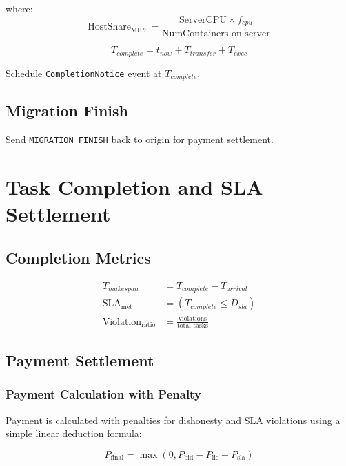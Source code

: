 \documentclass[12pt,a4paper]{article}
\begin{document}
where:
\begin{equation}
    \text{HostShare}_{\text{MIPS}} = \frac{\text{ServerCPU} \times f_{cpu}}{\text{NumContainers on server}}
\end{equation}

\begin{equation}
    T_{complete} = t_{now} + T_{transfer} + T_{exec}
\end{equation}

Schedule \texttt{CompletionNotice} event at $T_{complete}$.

\subsection{Migration Finish}

Send \texttt{MIGRATION\_FINISH} back to origin for payment settlement.

\section{Task Completion and SLA Settlement}

\subsection{Completion Metrics}

\begin{align}
    T_{makespan} &= T_{complete} - T_{arrival} \\
    \text{SLA}_{\text{met}} &= (T_{complete} \leq D_{sla}) \\
    \text{Violation}_{\text{ratio}} &= \frac{\text{violations}}{\text{total tasks}}
\end{align}

\subsection{Payment Settlement}

\subsubsection{Payment Calculation with Penalty}

Payment is calculated with penalties for dishonesty and SLA violations using a simple linear deduction formula:

\begin{equation}
    P_{\text{final}} = \max(0, P_{\text{bid}} - P_{\text{lie}} - P_{\text{sla}})
\end{equation}
\end{document}
